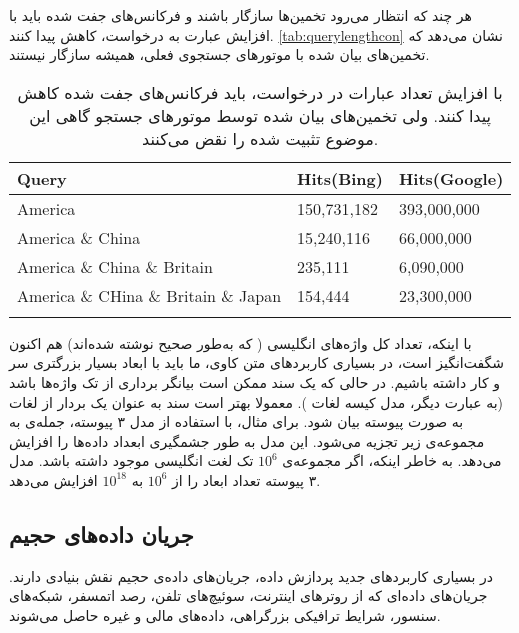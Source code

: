 هر چند که انتظار می‌رود تخمین‌ها سازگار باشند و فرکانس‌های جفت شده باید با افزایش عبارت به درخواست، کاهش پیدا کنند. 
\autoref{tab:querylengthcon}
نشان می‌دهد که تخمین‌های بیان شده با موتورهای جستجوی فعلی، همیشه سازگار نیستند.
\begin{table}[h]
\caption{
با افزایش تعداد عبارات در درخواست، باید فرکانس‌های جفت شده کاهش پیدا کنند. ولی تخمین‌های بیان شده توسط موتورهای جستجو گاهی این موضوع تثبیت شده را نقض می‌کنند.
}
\centering
\bigskip
\begin{latin}
\begin{tabular}{lll}
\hhline{===}
Query        				& Hits(Bing)    & Hits(Google) 	\\ \hline
America            			& 150,731,182 	& 393,000,000 	\\
America \& China          		& 15,240,116  	& 66,000,000 	\\
America \& China \& Britain     	& 235,111     	& 6,090,000     \\
America \& CHina \& Britain \& Japan 	& 154,444     	& 23,300,000    \\
\hhline{===}
\end{tabular}
\end{latin}
\label{tab:querylengthcon}
\end{table}

با اینکه، تعداد کل واژه‌های انگلیسی ( که به‌طور صحیح نوشته شده‌اند) هم اکنون شگفت‌انگیز است، در بسیاری کاربردهای متن کاوی، ما باید با ابعاد بسیار بزرگتری سر و کار داشته باشیم. در حالی که یک سند ممکن است بیانگر برداری از تک واژه‌ها باشد (به عبارت دیگر، مدل کیسه لغات%
). معمولا بهتر است سند به عنوان یک بردار از لغات به صورت 
پیوسته %
\cite{litez34}
بیان شود. برای مثال، با استفاده از مدل ۳ پیوسته، جمله‌ی
به مجموعه‌ی زیر تجزیه می‌شود. 
این مدل به طور جشمگیری ابعداد داده‌ها را افزایش می‌دهد. به خاطر اینکه، اگر مجموعه‌ی 
$10^6$
تک لغت انگلیسی موجود داشته باشد. مدل ۳ پیوسته تعداد ابعاد را از 
$10^6$
به 
$10^{18}$
افزایش می‌دهد.

\subsection{
جریان‌ داده‌‌های حجیم
}

در بسیاری کاربردهای جدید پردازش داده، جریان‌های داده‌ی حجیم نقش بنیادی دارند. جریان‌های داده‌ای که از روترهای اینترنت، سوئیچ‌های تلفن، رصد اتمسفر، شبکه‌های سنسور، شرایط ترافیکی بزرگراهی، داده‌های مالی و غیره 
\cite{litez5, litez141, litez49, litez19, litez96, litez69, litez91}
حاصل می‌شوند.

